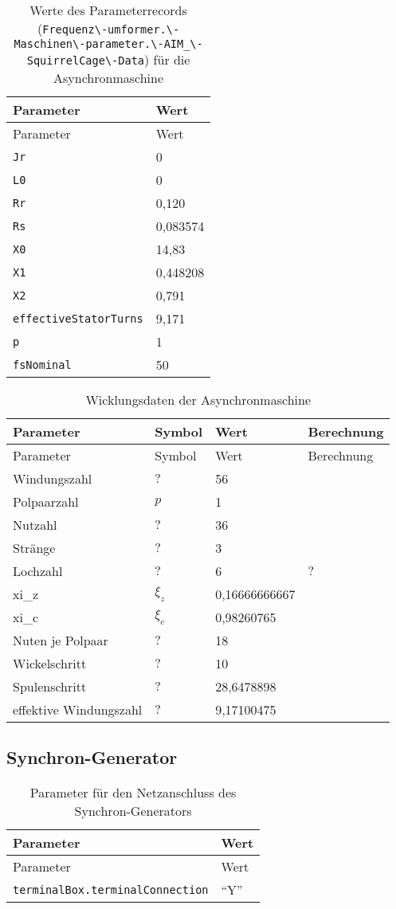 \begin{longtable}[]{@{}ll@{}}
\caption{Werte des Parameterrecords
(\texttt{Frequenz\textbackslash{}-umformer.\textbackslash{}-Maschinen\textbackslash{}-parameter.\textbackslash{}-AIM\_\textbackslash{}-SquirrelCage\textbackslash{}-Data})
für die Asynchronmaschine}\tabularnewline
\toprule
Parameter & Wert\tabularnewline
\midrule
\endfirsthead
\toprule
Parameter & Wert\tabularnewline
\midrule
\endhead
\texttt{Jr} & 0\tabularnewline
\texttt{L0} & 0\tabularnewline
\texttt{Rr} & 0,120\tabularnewline
\texttt{Rs} & 0,083574\tabularnewline
\texttt{X0} & 14,83\tabularnewline
\texttt{X1} & 0,448208\tabularnewline
\texttt{X2} & 0,791\tabularnewline
\texttt{effectiveStatorTurns} & 9,171\tabularnewline
\texttt{p} & 1\tabularnewline
\texttt{fsNominal} & 50\tabularnewline
\bottomrule
\end{longtable}

\begin{longtable}[]{@{}llll@{}}
\caption{Wicklungsdaten der Asynchronmaschine}\tabularnewline
\toprule
Parameter & Symbol & Wert & Berechnung\tabularnewline
\midrule
\endfirsthead
\toprule
Parameter & Symbol & Wert & Berechnung\tabularnewline
\midrule
\endhead
Windungszahl & \(?\) & 56 &\tabularnewline
Polpaarzahl & \(p\) & 1 &\tabularnewline
Nutzahl & \(?\) & 36 &\tabularnewline
Stränge & \(?\) & 3 &\tabularnewline
Lochzahl & \(?\) & 6 & \(?\)\tabularnewline
xi\_z & \(\xi_z\) & 0,16666666667 &\tabularnewline
xi\_c & \(\xi_c\) & 0,98260765 &\tabularnewline
Nuten je Polpaar & \(?\) & 18 &\tabularnewline
Wickelschritt & \(?\) & 10 &\tabularnewline
Spulenschritt & \(?\) & 28,6478898 &\tabularnewline
effektive Windungszahl & \(?\) & 9,17100475 &\tabularnewline
\bottomrule
\end{longtable}

\hypertarget{synchron-generator}{%
\subsection{Synchron-Generator}\label{synchron-generator}}

\begin{longtable}[]{@{}ll@{}}
\caption{Parameter für den Netzanschluss des
Synchron-Generators}\tabularnewline
\toprule
Parameter & Wert\tabularnewline
\midrule
\endfirsthead
\toprule
Parameter & Wert\tabularnewline
\midrule
\endhead
\texttt{terminalBox.terminalConnection} & ``Y''\tabularnewline
\bottomrule
\end{longtable}

